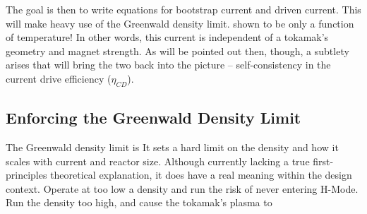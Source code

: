 The goal is then to write equations for bootstrap current and driven current. This will make heavy use of the Greenwald density limit.  shown to be only a function of temperature! In other words, this current is independent of a tokamak's geometry and magnet strength. As will be pointed out then, though, a subtlety arises that will bring the two back into the picture -- self-consistency in the current drive efficiency ($\eta_{CD}$).

\subsection{Enforcing the Greenwald Density Limit}

The Greenwald density limit is  It sets a hard limit on the density and how it scales with current and reactor size. Although currently lacking a true first-principles theoretical explanation, it does have a real meaning within the design context. Operate at too low a density and run the risk of never entering H-Mode. Run the density too high, and cause the tokamak's plasma to  

